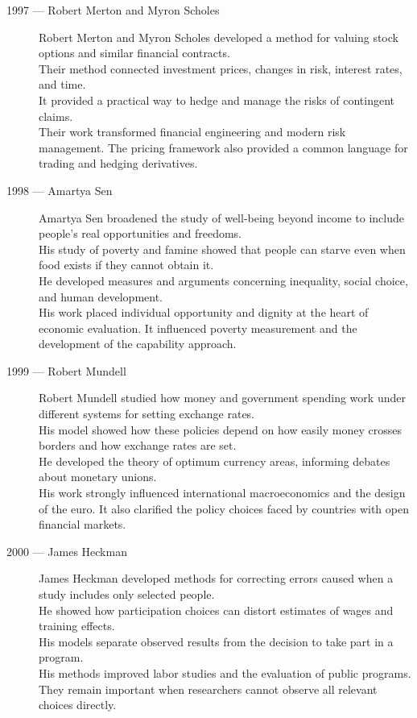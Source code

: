 \documentclass[12pt]{report}
\begin{document}
{\begin{description}
\item[1997 --- Robert Merton and Myron Scholes]
Robert Merton and Myron Scholes developed a method for valuing stock options and similar financial contracts.\\
Their method connected investment prices, changes in risk, interest rates, and time.\\
It provided a practical way to hedge and manage the risks of contingent claims.\\
Their work transformed financial engineering and modern risk management. The pricing framework also provided a common language for trading and hedging derivatives.

\item[1998 --- Amartya Sen]
Amartya Sen broadened the study of well-being beyond income to include people's real opportunities and freedoms.\\
His study of poverty and famine showed that people can starve even when food exists if they cannot obtain it.\\
He developed measures and arguments concerning inequality, social choice, and human development.\\
His work placed individual opportunity and dignity at the heart of economic evaluation. It influenced poverty measurement and the development of the capability approach.

\item[1999 --- Robert Mundell]
Robert Mundell studied how money and government spending work under different systems for setting exchange rates.\\
His model showed how these policies depend on how easily money crosses borders and how exchange rates are set.\\
He developed the theory of optimum currency areas, informing debates about monetary unions.\\
His work strongly influenced international macroeconomics and the design of the euro. It also clarified the policy choices faced by countries with open financial markets.

\item[2000 --- James Heckman]
James Heckman developed methods for correcting errors caused when a study includes only selected people.\\
He showed how participation choices can distort estimates of wages and training effects.\\
His models separate observed results from the decision to take part in a program.\\
His methods improved labor studies and the evaluation of public programs. They remain important when researchers cannot observe all relevant choices directly.


\end{description}}
\end{document}
